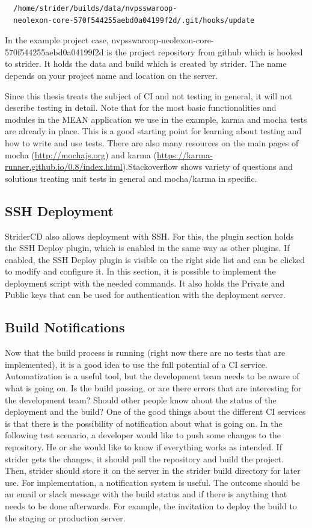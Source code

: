 \begin{lstlisting}
  /home/strider/builds/data/nvpsswaroop-
  neolexon-core-570f544255aebd0a04199f2d/.git/hooks/update
\end{lstlisting}

In the example project case, nvpsswaroop-neolexon-core-570f544255aebd0a04199f2d is the project repository from github which is hooked to strider.
It holds the data and build which is created by strider. The name depends on your project name and location on the server.

Since this thesis treats the subject of CI and not testing in general, it will not describe testing in detail. Note that for the
most basic functionalities and modules in the MEAN application we use in the example, karma and mocha tests are already in place.
This is a good starting point for learning about testing and how to write and use tests. There are also many resources
on the main pages of mocha (\url{http://mochajs.org}) and karma (\url{https://karma-runner.github.io/0.8/index.html}).Stackoverflow
shows variety of questions and solutions treating unit tests in general and mocha/karma in specific.

\subsection{SSH Deployment}
\label{section:SSH Deployment}
StriderCD also allows deployment with SSH. For this, the plugin section holds the SSH Deploy plugin, which is enabled in the same way
as other plugins. If enabled, the SSH Deploy plugin is visible on the right side list and can be clicked to modify and configure it. In this
section, it is possible to implement the deployment script with the needed commands. It also holds the Private and Public keys that can be used
for authentication with the deployment server.

\subsection{Build Notifications}
\label{section:Build Notifications}
Now that the build process is running (right now there are no tests that are implemented), it is a
good idea to use the full potential of a CI service. Automatization is a useful tool, but the development team needs to be aware of
what is going on. Is the build passing, or are there errors that are interesting for the development team? Should other people
know about the status of the deployment and the build? One of the good things about the different CI services is that there is the
possibility of notification about what is going on. In the following test scenario, a developer would like to push some changes to the repository.
He or she would like to know if everything works as intended. If strider gets the changes, it should pull the repository and build the
project. Then, strider should store it on the server in the strider build directory for later use. For implementation, a notification system is useful.
The outcome should be an email or slack message with the build status and if there is anything that needs to be done afterwards. For example,
the invitation to deploy the build to the staging or production server.

